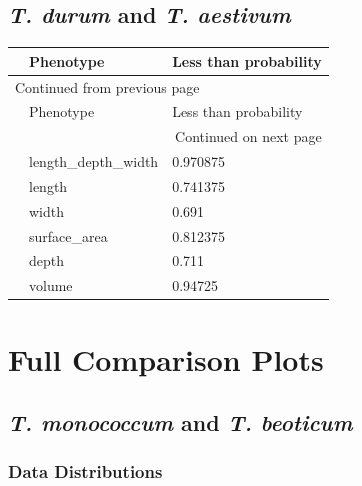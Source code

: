 \documentclass[11pt]{report}
\begin{document}
\section{\emph{T. durum} and \emph{T. aestivum}}
\label{sec:orgf807fca}
\begin{longtable}{l|l|l}
 & Phenotype & Less than probability\\
\hline
\endfirsthead
\multicolumn{3}{l}{Continued from previous page} \\
\hline

 & Phenotype & Less than probability \\

\hline
\endhead
\hline\multicolumn{3}{r}{Continued on next page} \\
\endfoot
\endlastfoot
\hline
 & length\_depth\_width & 0.970875\\
 & length & 0.741375\\
 & width & 0.691\\
 & surface\_area & 0.812375\\
 & depth & 0.711\\
 & volume & 0.94725\\
\end{longtable}


\chapter{Full Comparison Plots}
\label{sec:orgbee8510}

\section{\emph{T. monococcum} and \emph{T. beoticum}}
\label{sec:orge6bdbbc}
\subsection{Data Distributions}
\label{sec:orgc4d6337}
\end{document}
